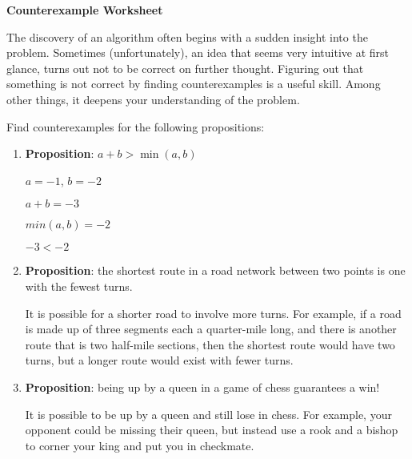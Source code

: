 \documentclass[12pt]{article}
\begin{document}
\newcommand{\lsp}[1]{\large\renewcommand{\baselinestretch}{#1}\normalsize}

\lsp{1}
\pagestyle{plain}
\begin{center}
    {\bf
        Counterexample Worksheet
    }
\end{center}

The discovery of an algorithm often begins with a sudden insight into the
problem. Sometimes (unfortunately), an idea that seems very intuitive at
first glance, turns out not to be correct on further thought. Figuring
out that something is not correct by finding counterexamples is a useful
skill. Among other things, it deepens your understanding of the problem.

Find counterexamples for the following propositions:
\begin{enumerate}
    \item
          {\bf Proposition}: $a + b > \min(a,b)$

          $a = -1$, $b = -2$

          $a + b = -3$

          $min(a, b) = -2$

          $-3 < -2$
          \vspace*{0.5in}

    \item
          {\bf Proposition}: the shortest route in a road network between two points
          is one with the fewest turns.

          It is possible for a shorter road to involve more turns. For example, if a road is made up of
          three segments each a quarter-mile long, and there is another route that is two half-mile sections,
          then the shortest route would have two turns, but a longer route would exist with fewer turns.

          \vspace*{0.5in}

    \item
          {\bf Proposition}: being up by a queen in a game of chess guarantees a
          win!

          It is possible to be up by a queen and still lose in chess. For example, your opponent could be
          missing their queen, but instead use a rook and a bishop to corner your king and put you in checkmate.

          \vspace*{0.5in}

\end{enumerate}
\end{document}
